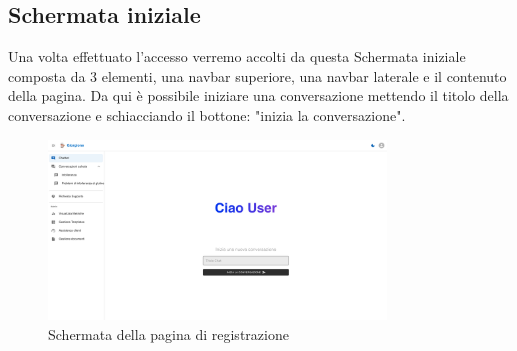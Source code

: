 \subsection{Schermata iniziale}
Una volta effettuato l'accesso verremo accolti da questa Schermata iniziale composta da 3 elementi, una navbar superiore, una navbar laterale e il contenuto della pagina. Da qui è possibile iniziare una conversazione mettendo il titolo della conversazione e schiacciando il bottone: "inizia la conversazione".
\begin{figure}[h!]
    \centering
    \includegraphics[width=0.8\textwidth]{./img/paginaIniziale.png}
    \caption{Schermata della pagina di registrazione}
\end{figure}

